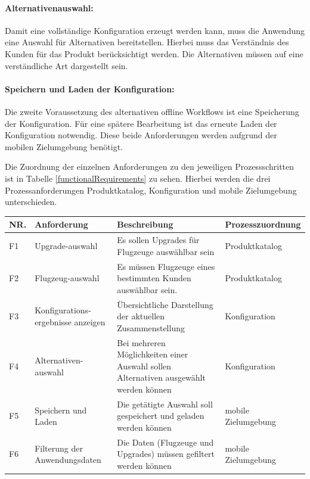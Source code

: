 \paragraph{Alternativenauswahl: } Damit eine vollständige Konfiguration erzeugt werden kann, muss die Anwendung eine Auswahl für Alternativen bereitstellen. Hierbei muss das Verständnis des Kunden für das Produkt berücksichtigt werden. Die Alternativen müssen auf eine verständliche Art dargestellt sein. 

\paragraph{Speichern und Laden der Konfiguration: } Die zweite Voraussetzung des alternativen offline Workflows ist eine Speicherung der Konfiguration. Für eine spätere Bearbeitung ist das erneute Laden der Konfiguration notwendig. Diese beide Anforderungen werden aufgrund der mobilen Zielumgebung benötigt.

Die Zuordnung der einzelnen Anforderungen zu den jeweiligen Prozessschritten ist in Tabelle \ref{functionalRequirements} zu sehen. Hierbei werden die drei Prozessanforderungen Produktkatalog, Konfiguration und mobile Zielumgebung unterschieden.
\par 
\begin{tabular}[H]{| p{0.4cm} | p{2.5cm} | p{5.9cm} | p{4.5cm} |}
\toprule[2pt] \rowcolor{dunkelgrau}
\hline
  NR. & Anforderung & Beschreibung & Prozesszuordnung \\
  \hline
  F1 & Upgrade-auswahl & Es sollen Upgrades für Flugzeuge auswählbar sein & Produktkatalog
   \\
  \hline
  F2 & Flugzeug-auswahl & Es müssen Flugzeuge eines bestimmten Kunden auswählbar sein. & Produktkatalog  \\
  \hline
    F3 & Konfigurations-ergebnisse anzeigen & Übersichtliche Darstellung der aktuellen Zusammenstellung & Konfiguration \\
    \hline
     F4 & Alternativen-auswahl & Bei mehreren Möglichkeiten einer Auswahl sollen Alternativen ausgewählt werden können & Konfiguration \\
        \hline
    F5 & Speichern und Laden & Die getätigte Auswahl soll gespeichert und geladen werden können& mobile Zielumgebung \\
    \hline
    F6 & Filterung der Anwendungsdaten & Die Daten (Flugzeuge und Upgrades) müssen gefiltert werden können & mobile Zielumgebung \\
    \hline
\bottomrule[2pt]
\end{tabular}
\label{functionalRequirements}





